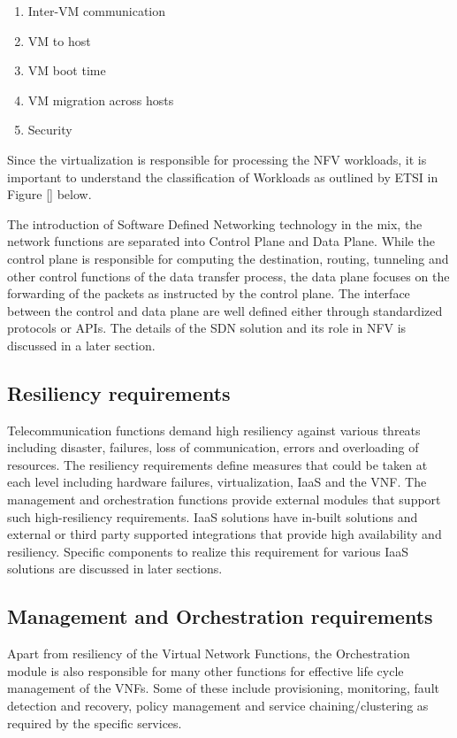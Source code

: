 \begin{enumerate}
    \item Inter-VM communication
    \item VM to host 
    \item VM boot time
    \item VM migration across hosts
    \item Security
\end{enumerate}


Since the virtualization is responsible for processing the NFV workloads, it is important to understand the classification of Workloads as outlined by ETSI in Figure [] below.

The introduction of Software Defined Networking technology in the mix, the network functions are separated into Control Plane and Data Plane. While the control plane is responsible for computing the destination, routing, tunneling and other control functions of the data transfer process, the data plane focuses on the forwarding of the packets as instructed by the control plane. The interface between the control and data plane are well defined either through standardized protocols or APIs. The details of the SDN solution and its role in NFV is discussed in a later section. 

	
\subsection{Resiliency requirements}

Telecommunication functions demand high resiliency against various threats including disaster, failures, loss of communication, errors and overloading of resources. The resiliency requirements define measures that could be taken at each level including hardware failures, virtualization, IaaS and the VNF. The management and orchestration functions provide external modules that support such high-resiliency requirements. IaaS solutions have in-built solutions and external or third party supported integrations that provide high availability and resiliency. Specific components to realize this requirement for various IaaS solutions are discussed in later sections.

	
\subsection{Management and Orchestration requirements}

Apart from resiliency of the Virtual Network Functions, the Orchestration module is also responsible for many other functions for effective life cycle management of the VNFs. Some of these include provisioning, monitoring, fault detection and recovery, policy management and service chaining/clustering as required by the specific services.
